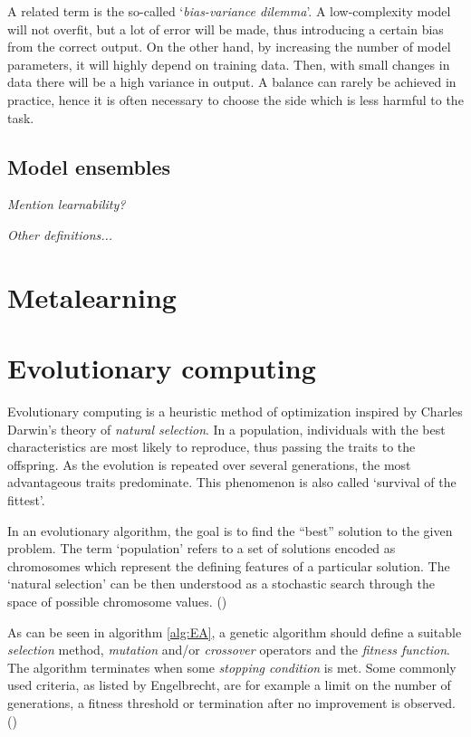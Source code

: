 A related term is the so-called `\textit{bias-variance dilemma}'. A low-complexity model will not overfit, but a lot of error will be made, thus introducing a certain bias from the correct output. On the other hand, by increasing the number of model parameters, it will highly depend on training data. Then, with small changes in data there will be a high variance in output. A balance can rarely be achieved in practice, hence it is often necessary to choose the side which is less harmful to the task.

\subsection{Model ensembles}
\textit{Mention learnability?}

\textit{Other definitions...}

\section{Metalearning}


\section{Evolutionary computing}
Evolutionary computing is a heuristic method of optimization inspired by Charles Darwin's theory of \textit{natural selection}. \cite{darwin} In a population, individuals with the best characteristics are most likely to reproduce, thus passing the traits to the offspring. As the evolution is repeated over several generations, the most advantageous traits predominate. This phenomenon is also called `survival of the fittest'. %

In an evolutionary algorithm, the goal is to find the ``best'' solution to the given problem. The term `population' refers to a set of solutions encoded as chromosomes which represent the defining features of a particular solution. The `natural selection' can be then understood as a stochastic search through the space of possible chromosome values. (\cite{Engelbrecht:2007:CII:1557464}) %

As can be seen in algorithm \ref{alg:EA}, a genetic algorithm should define a suitable \textit{selection} method, \textit{mutation} and/or \textit{crossover} operators and the \textit{fitness function}. The algorithm terminates when some \textit{stopping condition} is met. Some commonly used criteria, as listed by Engelbrecht, are for example a limit on the number of generations, a fitness threshold or termination after no improvement is observed. (\citep{Engelbrecht:2007:CII:1557464})

